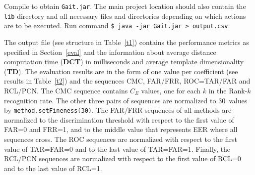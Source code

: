 \documentclass[10pt,a4paper]{llncs}
\newcommand{\gC}{\ensuremath{C}} %
\newcommand{\gE}[1]{\ensuremath{{#1}_E}} %
\begin{document}
Compile to obtain \texttt{Gait.jar}. The main project location should also contain the \texttt{lib} directory and all necessary files and directories depending on which actions are to be executed. Run command \texttt{\$ java -jar Gait.jar > output.csv}.

The output file (see structure in Table~\ref{t1}) contains the performance metrics as specified in Section~\ref{eval} and the information about average distance computation time (\textbf{DCT}) in milliseconds and average template dimensionality (\textbf{TD}). The evaluation results are in the form of one value per coefficient (see results in Table~\ref{t2}) and the sequences CMC, FAR/FRR, ROC=TAR/FAR and RCL/PCN. The CMC sequence contains $\gE{\gC}$ values, one for each $k$ in the Rank-$k$ recognition rate. The other three pairs of sequences are normalized to 30~values by \texttt{method.setFineness(30)}. The FAR/FRR sequences of all methods are normalized to the discrimination threshold with respect to the first value of FAR=0 and FRR=1, and to the middle value that represents EER where all sequences cross. The ROC sequences are normalized with respect to the first value of TAR=FAR=0 and to the last value of TAR=FAR=1. Finally, the RCL/PCN sequences are normalized with respect to the first value of RCL=0 and to the last value of RCL=1.
\end{document}
